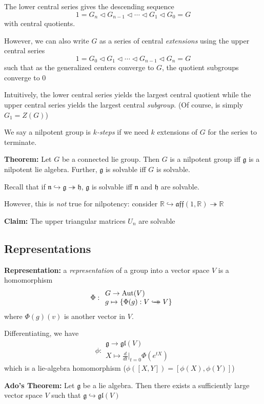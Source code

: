 \documentclass[12pt]{article}
\newcommand{\R}{\mathbb{R}}
\newcommand{\biject}{\hookrightarrow \hspace{-8pt} \rightarrow}
\newcommand{\g}{\mathfrak{g}}
\newcommand{\gl}{\mathfrak{gl}}
\newcommand{\Aut}{\text{Aut}}
\begin{document}
The lower central series gives the descending sequence 
\[1 = G_n \triangleleft G_{n-1} \triangleleft \cdots \triangleleft G_1 \triangleleft G_0 = G\]
with central quotients. 

However, we can also write $G$ as a series of central \emph{extensions} using the upper central series 
\[1 = G_0 \triangleleft G_1 \triangleleft \cdots \triangleleft G_{n-1} \triangleleft G_n = G\]
such that as the generalized centers converge to $G$, the quotient subgroups converge to $0$

Intuitively, the lower central series yields the largest central quotient while the upper central series yields the largest central \emph{subgroup}. (Of course, is simply $G_1 = Z(G)$)

We say a nilpotent group is \emph{$k$-steps} if we need $k$ extensions of $G$ for the series to terminate. 

\textbf{Theorem:} Let $G$ be a connected lie group. Then $G$ is a nilpotent group iff $\g$ is a nilpotent lie algebra. Further, $\g$ is solvable iff $G$ is solvable. 

Recall that if $\mathfrak{n} \hookrightarrow \mathfrak{g} \twoheadrightarrow \mathfrak{h}$, $\g$ is solvable iff $\mathfrak{n}$ and $\mathfrak{h}$ are solvable.
 
However, this is \emph{not} true for nilpotency: consider $\R \hookrightarrow \mathfrak{aff}(1, \R) \twoheadrightarrow \R$ 

\textbf{Claim:} The upper triangular matrices $U_n$ are solvable

\subsection*{Representations}
\textbf{Representation:} a \emph{representation} of a group into a vector space $V$ is a homomorphism 
\[\Phi: \begin{array}{l}
    G \to \Aut(V)\\
    g \mapsto \{\Phi(g): V \biject V\}
\end{array}\]
where $\Phi(g)(v)$ is another vector in $V$. 

Differentiating, we have 
\[\phi: \begin{array}{l}
    \g \to \gl(V)\\ 
    X \mapsto \frac{d}{dt}\big\vert_{t=0} \Phi(e^{tX})
\end{array}\]
which is a lie-algebra homomorphism ($\phi([X, Y]) = [\phi(X), \phi(Y)]$)

\textbf{Ado's Theorem:} Let $\g$ be a lie algebra. Then there exists a sufficiently large vector space $V$ such that $\g \hookrightarrow \gl(V)$
\end{document}
